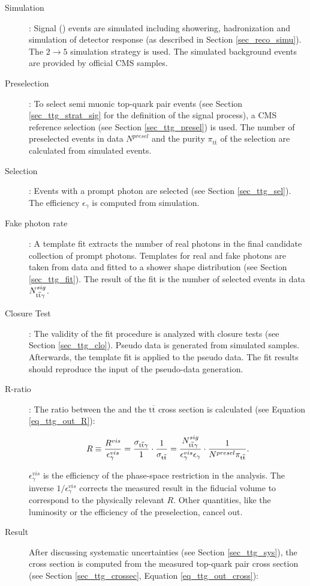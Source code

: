 \begin{description}
\item[Simulation]: Signal (\ttgamma) events are simulated including showering, hadronization and simulation of detector response (as described in Section \ref{sec_reco_simu}). The $2 \to 5$ simulation strategy is used. The simulated background events are provided by official CMS samples.
\item[Preselection]: To select semi muonic top-quark pair events (see Section \ref{sec_ttg_strat_sig} for the definition of the signal process), a CMS reference selection (see Section \ref{sec_ttg_presel}) is used. The number of preselected events in data $N^{presel}$ and the purity $\pi_{\mathrm{t}\overline{\mathrm{t}}}$ of the selection are calculated from simulated events.
\item[Selection]: Events with a prompt photon are selected (see Section \ref{sec_ttg_sel}). The efficiency $\epsilon_{\gamma}$ is computed from simulation.
\item[Fake photon rate]: A template fit extracts the number of real photons in the final candidate collection of prompt photons. Templates for real and fake photons are taken from data and fitted to a shower shape distribution (see Section \ref{sec_ttg_fit}). The result of the fit is the number of selected \ttgamma events in data $N^{sig}_{\mathrm{t}\overline{\mathrm{t}} \gamma}$.
\item[Closure Test]: The validity of the fit procedure is analyzed with closure tests (see Section \ref{sec_ttg_clo}). Pseudo data is generated from simulated samples. Afterwards, the template fit is applied to the pseudo data. The fit results should reproduce the input of the pseudo-data generation.
\item[R-ratio]: The ratio between the \ttgamma and the $\mathrm{t}\overline{\mathrm{t}}$ cross section is calculated (see Equation \ref{eq_ttg_out_R}):

\begin{equation}
R \equiv \frac{R^{vis}}{\epsilon^{vis}_{\gamma}} = \frac{\sigma_{\mathrm{t}\overline{\mathrm{t}} \gamma}}{1} \cdot \frac{1}{\sigma_{\mathrm{t}\overline{\mathrm{t}}}} = \frac{N^{sig}_{\mathrm{t}\overline{\mathrm{t}} \gamma}}{\epsilon^{vis}_{\gamma} \epsilon_{\gamma}} \cdot \frac{1}{N^{presel} \pi_{\mathrm{t}\overline{\mathrm{t}}}}.
\label{eq_ttg_out_R}
\end{equation}

$\epsilon_{\gamma}^{vis}$ is the efficiency of the phase-space restriction in the analysis. The inverse $1 / \epsilon_{\gamma}^{vis}$ corrects the measured result in the fiducial volume to correspond to the physically relevant $R$. Other quantities, like the luminosity or the efficiency of the preselection, cancel out. 
\item[Result] After discussing systematic uncertainties (see Section \ref{sec_ttg_sys}), the \ttgamma cross section is computed from the measured top-quark pair cross section (see Section \ref{sec_ttg_crossec}, Equation \ref{eq_ttg_out_cross}):


\end{description}
